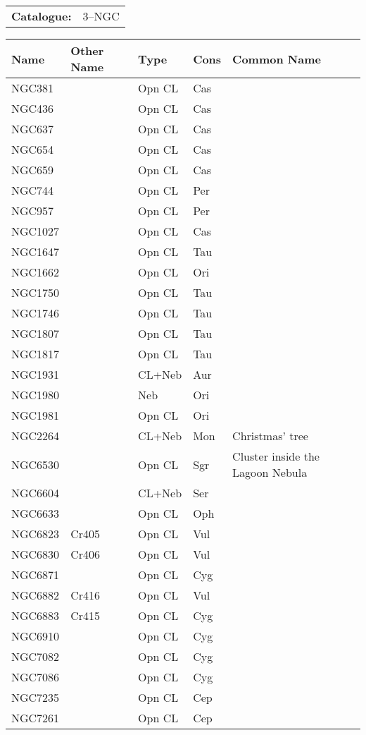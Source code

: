 \begin{tabular}{ p{0.9in} p{1.3in}}
{\bf Catalogue:} & 3--NGC \\ 
\end{tabular}
\begin{longtable}{ p{0.7in}  p{1.0in}  p{0.6in}  p{0.9in}  p{5.1in} }
\hline 
{\bf Name} & {\bf Other Name} & {\bf Type} & {\bf Cons} & {\bf Common Name} \\ 
\hline 
NGC381 &  & Opn CL & Cas &  \\ 
NGC436 &  & Opn CL & Cas &  \\ 
NGC637 &  & Opn CL & Cas &  \\ 
NGC654 &  & Opn CL & Cas &  \\ 
NGC659 &  & Opn CL & Cas &  \\ 
NGC744 &  & Opn CL & Per &  \\ 
NGC957 &  & Opn CL & Per &  \\ 
NGC1027 &  & Opn CL & Cas &  \\ 
NGC1647 &  & Opn CL & Tau &  \\ 
NGC1662 &  & Opn CL & Ori &  \\ 
NGC1750 &  & Opn CL & Tau &  \\ 
NGC1746 &  & Opn CL & Tau &  \\ 
NGC1807 &  & Opn CL & Tau &  \\ 
NGC1817 &  & Opn CL & Tau &  \\ 
NGC1931 &  & CL+Neb & Aur &  \\ 
NGC1980 &  & Neb & Ori &  \\ 
NGC1981 &  & Opn CL & Ori &  \\ 
NGC2264 &  & CL+Neb & Mon & Christmas' tree \\ 
NGC6530 &  & Opn CL & Sgr & Cluster inside the Lagoon Nebula \\ 
NGC6604 &  & CL+Neb & Ser &  \\ 
NGC6633 &  & Opn CL & Oph &  \\ 
NGC6823 & Cr405 & Opn CL & Vul &  \\ 
NGC6830 & Cr406 & Opn CL & Vul &  \\ 
NGC6871 &  & Opn CL & Cyg &  \\ 
NGC6882 & Cr416 & Opn CL & Vul &  \\ 
NGC6883 & Cr415 & Opn CL & Cyg &  \\ 
NGC6910 &  & Opn CL & Cyg &  \\ 
NGC7082 &  & Opn CL & Cyg &  \\ 
NGC7086 &  & Opn CL & Cyg &  \\ 
NGC7235 &  & Opn CL & Cep &  \\ 
NGC7261 &  & Opn CL & Cep &  \\ 
\hline 
\end{longtable} 
